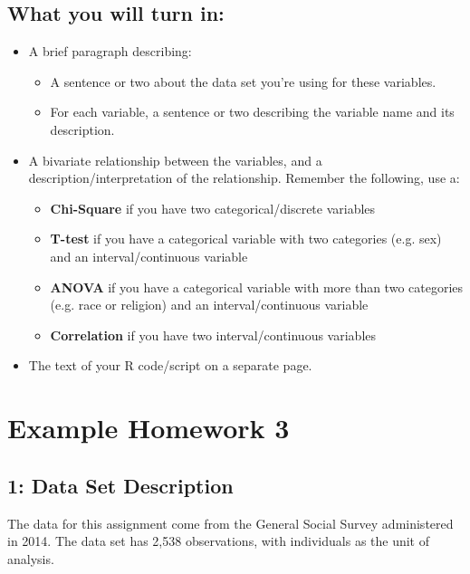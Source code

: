 \documentclass{article}
\begin{document}
\subsection*{What you will turn in:}
\begin{itemize}
\item A brief paragraph describing:
	\begin{itemize}
	\item A sentence or two about the data set you're using for these variables.
	\item For each variable, a sentence or two describing the variable name and its description.
	\end{itemize}	
\item A bivariate relationship between the variables, and a description/interpretation of the relationship. Remember the following, use a:
	\begin{itemize}
	\item \textbf{Chi-Square} if you have two categorical/discrete variables
	\item \textbf{T-test} if you have a categorical variable with two categories (e.g. sex) and an interval/continuous variable
	\item \textbf{ANOVA} if you have a categorical variable with more than two categories (e.g. race or religion) and an interval/continuous variable
	\item \textbf{Correlation} if you have two interval/continuous variables
	\end{itemize}

\item The text of your R code/script on a separate page.
\end{itemize}

\newpage
\section*{\center Example Homework 3}

\subsection*{1: Data Set Description}
The data for this assignment come from the General Social Survey administered in 2014. The data set has 2,538 observations, with individuals as the unit of analysis. \newline
\end{document}
